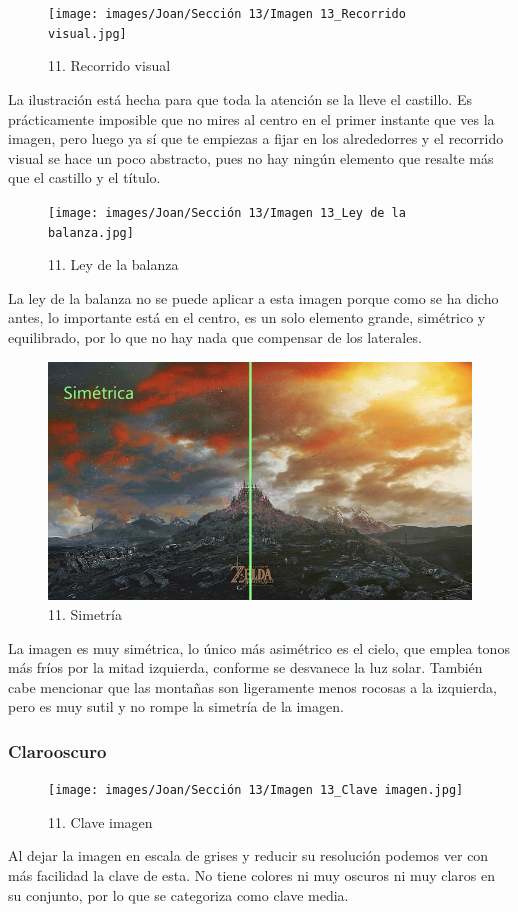 \documentclass[12pt]{article}
\begin{document}
        \begin{figure}[H]
          \centering
          \texttt{[image: images/Joan/Sección 13/Imagen 13\_Recorrido visual.jpg]}
          \caption{\small 11. Recorrido visual}
        \end{figure}
        La ilustración está hecha para que toda la atención se la lleve el castillo. Es prácticamente imposible que no mires al centro en el primer instante que ves la imagen, pero luego ya sí que te empiezas a fijar en los alrededorres y el recorrido visual se hace un poco abstracto, pues no hay ningún elemento que resalte más que el castillo y el título. 

    \begin{figure}[H]
          \centering
          \texttt{[image: images/Joan/Sección 13/Imagen 13\_Ley de la balanza.jpg]}
          \caption{\small 11. Ley de la balanza}
        \end{figure}
        La ley de la balanza no se puede aplicar a esta imagen porque como se ha dicho antes, lo importante está en el centro, es un solo elemento grande, simétrico y equilibrado, por lo que no hay nada que compensar de los laterales. 

    \begin{figure}[H]
          \centering
          \includegraphics[width=\textwidth]{images/Joan/Sección 13/Imagen 13_Simetría.jpg}
          \caption{\small 11. Simetría}
        \end{figure}
        La imagen es muy simétrica, lo único más asimétrico es el cielo, que emplea tonos más fríos por la mitad izquierda, conforme se desvanece la luz solar. También cabe mencionar que las montañas son ligeramente menos rocosas a la izquierda, pero es muy sutil y no rompe la simetría de la imagen. 

            \subsubsection{Clarooscuro}
            \begin{figure}[H]
          \centering
          \texttt{[image: images/Joan/Sección 13/Imagen 13\_Clave imagen.jpg]}
          \caption{\small 11. Clave imagen}
        \end{figure}
        Al dejar la imagen en escala de grises y reducir su resolución podemos ver con más facilidad la clave de esta. No tiene colores ni muy oscuros ni muy claros en su conjunto, por lo que se categoriza como clave media. 
\end{document}
